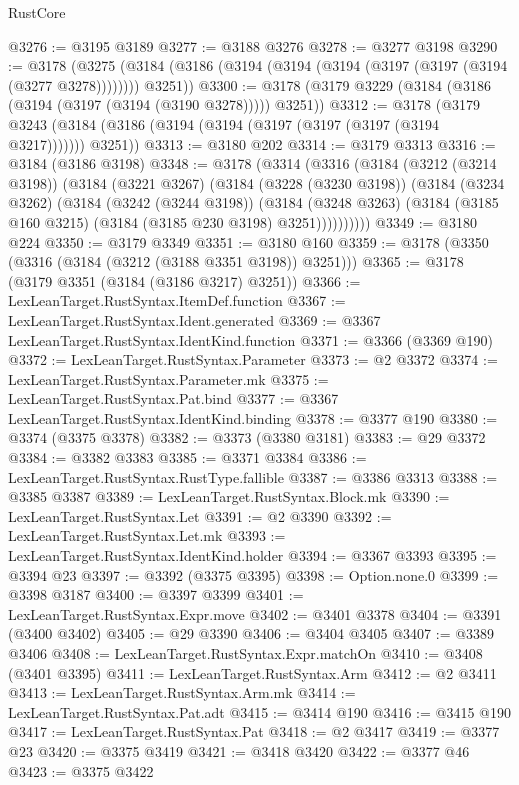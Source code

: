 \begin{lexlean}{RustCore}
\begin{coremodule}
@3276 := @3195 @3189
@3277 := @3188 @3276
@3278 := @3277 @3198
@3290 := @3178
    (@3275 (@3184 (@3186 (@3194 (@3194 (@3194 (@3197 (@3197 (@3194 (@3277 @3278)))))))) @3251))
@3300 := @3178 (@3179 @3229 (@3184 (@3186 (@3194 (@3197 (@3194 (@3190 @3278))))) @3251))
@3312 := @3178
    (@3179 @3243 (@3184 (@3186 (@3194 (@3194 (@3197 (@3197 (@3197 (@3194 @3217))))))) @3251))
@3313 := @3180 @202
@3314 := @3179 @3313
@3316 := @3184 (@3186 @3198)
@3348 := @3178
    (@3314
      (@3316
        (@3184
          (@3212 (@3214 @3198))
          (@3184
            (@3221 @3267)
            (@3184
              (@3228 (@3230 @3198))
              (@3184
                (@3234 @3262)
                (@3184
                  (@3242 (@3244 @3198))
                  (@3184
                    (@3248 @3263)
                    (@3184 (@3185 @160 @3215) (@3184 (@3185 @230 @3198) @3251))))))))))
@3349 := @3180 @224
@3350 := @3179 @3349
@3351 := @3180 @160
@3359 := @3178 (@3350 (@3316 (@3184 (@3212 (@3188 @3351 @3198)) @3251)))
@3365 := @3178 (@3179 @3351 (@3184 (@3186 @3217) @3251))
@3366 := LexLeanTarget.RustSyntax.ItemDef.function
@3367 := LexLeanTarget.RustSyntax.Ident.generated
@3369 := @3367 LexLeanTarget.RustSyntax.IdentKind.function
@3371 := @3366 (@3369 @190)
@3372 := LexLeanTarget.RustSyntax.Parameter
@3373 := @2 @3372
@3374 := LexLeanTarget.RustSyntax.Parameter.mk
@3375 := LexLeanTarget.RustSyntax.Pat.bind
@3377 := @3367 LexLeanTarget.RustSyntax.IdentKind.binding
@3378 := @3377 @190
@3380 := @3374 (@3375 @3378)
@3382 := @3373 (@3380 @3181)
@3383 := @29 @3372
@3384 := @3382 @3383
@3385 := @3371 @3384
@3386 := LexLeanTarget.RustSyntax.RustType.fallible
@3387 := @3386 @3313
@3388 := @3385 @3387
@3389 := LexLeanTarget.RustSyntax.Block.mk
@3390 := LexLeanTarget.RustSyntax.Let
@3391 := @2 @3390
@3392 := LexLeanTarget.RustSyntax.Let.mk
@3393 := LexLeanTarget.RustSyntax.IdentKind.holder
@3394 := @3367 @3393
@3395 := @3394 @23
@3397 := @3392 (@3375 @3395)
@3398 := Option.none.{0}
@3399 := @3398 @3187
@3400 := @3397 @3399
@3401 := LexLeanTarget.RustSyntax.Expr.move
@3402 := @3401 @3378
@3404 := @3391 (@3400 @3402)
@3405 := @29 @3390
@3406 := @3404 @3405
@3407 := @3389 @3406
@3408 := LexLeanTarget.RustSyntax.Expr.matchOn
@3410 := @3408 (@3401 @3395)
@3411 := LexLeanTarget.RustSyntax.Arm
@3412 := @2 @3411
@3413 := LexLeanTarget.RustSyntax.Arm.mk
@3414 := LexLeanTarget.RustSyntax.Pat.adt
@3415 := @3414 @190
@3416 := @3415 @190
@3417 := LexLeanTarget.RustSyntax.Pat
@3418 := @2 @3417
@3419 := @3377 @23
@3420 := @3375 @3419
@3421 := @3418 @3420
@3422 := @3377 @46
@3423 := @3375 @3422

\end{coremodule}
\end{lexlean}
